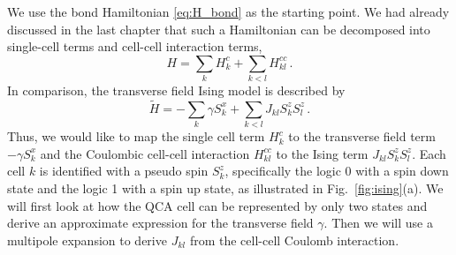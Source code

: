 We use the bond Hamiltonian \eqref{eq:H_bond} as the starting point. We
had already discussed in the last chapter that such a Hamiltonian can be
decomposed into single-cell terms and cell-cell interaction terms,
\begin{equation}
  H = \sum_k H^c_k + \sum_{k<l} H^{cc}_{kl} \, .
\end{equation}
In comparison, the transverse field Ising model is described by
%
\begin{equation}
  \tilde{H} = - \sum_k \gamma S^x_k + \sum_{k<l} J_{kl} S^z_k S^z_l \, .
\end{equation}
%
Thus, we would like to map the single cell term $H^c_k$ to the transverse field
term $-\gamma S^x_k$ and the Coulombic cell-cell interaction $H^{cc}_{kl}$ to 
the Ising term $J_{kl} S^z_k S^z_l$. Each cell $k$ is identified with a pseudo
spin $S^z_k$, specifically the logic 0 with a spin down state and the logic 1
with a spin up state, as illustrated in Fig.~\ref{fig:ising}(a). We will first
look at how the QCA cell can be represented by only two states and derive an
approximate expression for the transverse field $\gamma$. Then we will use a
multipole expansion to derive $J_{kl}$ from the cell-cell Coulomb interaction.

